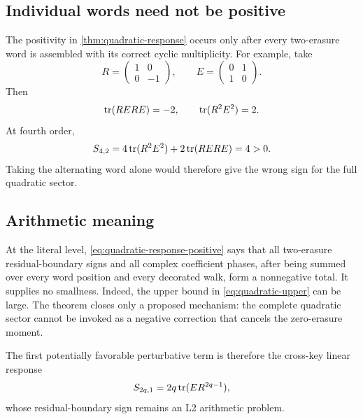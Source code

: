 \subsection{Individual words need not be positive}

The positivity in \cref{thm:quadratic-response} occurs only after every
two-erasure word is assembled with its correct cyclic multiplicity.  For
example, take
\[
 R=\begin{pmatrix}1&0\\0&-1\end{pmatrix},
 \qquad
 E=\begin{pmatrix}0&1\\1&0\end{pmatrix}.
\]
Then
\[
 \operatorname{tr}(RERE)=-2,
\qquad
 \operatorname{tr}(R^2E^2)=2.
\]
At fourth order,
\[
 S_{4,2}
 =
4\operatorname{tr}(R^2E^2)+2\operatorname{tr}(RERE)
=4>0.
\]
Taking the alternating word alone would therefore give the wrong sign for
the full quadratic sector.

\subsection{Arithmetic meaning}

At the literal level, \eqref{eq:quadratic-response-positive} says that all
two-erasure residual-boundary signs and all complex coefficient phases,
after being summed over every word position and every decorated walk, form
a nonnegative total.  It supplies no smallness.  Indeed, the upper bound in
\eqref{eq:quadratic-upper} can be large.  The theorem closes only a proposed
mechanism: the complete quadratic sector cannot be invoked as a negative
correction that cancels the zero-erasure moment.

The first potentially favorable perturbative term is therefore the
cross-key linear response
\[
 S_{2q,1}=2q\operatorname{tr}(ER^{2q-1}),
\]
whose residual-boundary sign remains an L2 arithmetic problem.
